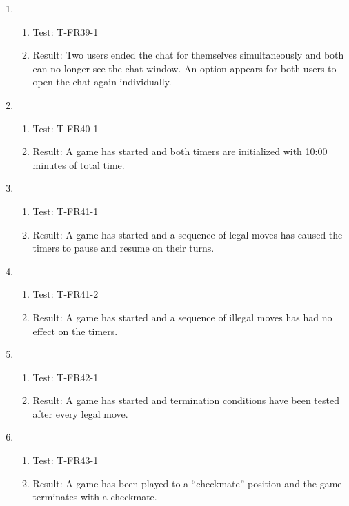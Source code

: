 \documentclass[12pt, titlepage]{article}
\begin{document}
\begin{enumerate}[\indent {}]
        \item 
            \begin{enumerate}[ ]
                \item Test: T-FR39-1
                \item Result: Two users ended the chat for themselves simultaneously and both can no longer see the chat window. An option appears for both users to open the chat again individually.
            \end{enumerate}
            
        \item 
            \begin{enumerate}[ ]
                \item Test: T-FR40-1
                \item Result: A game has started and both timers are initialized with 10:00 minutes of total time.
            \end{enumerate}
            
        \item 
            \begin{enumerate}[ ]
                \item Test: T-FR41-1
                \item Result: A game has started and a sequence of legal moves has caused the timers to pause and resume on their turns.
            \end{enumerate}
            
        \item 
            \begin{enumerate}[ ]
                \item Test: T-FR41-2
                \item Result: A game has started and a sequence of illegal moves has had no effect on the timers.
            \end{enumerate}
            
        \item 
            \begin{enumerate}[ ]
                \item Test: T-FR42-1
                \item Result: A game has started and termination conditions have been tested after every legal move.
            \end{enumerate}
            
        \item 
            \begin{enumerate}[ ]
                \item Test: T-FR43-1
                \item Result: A game has been played to a ``checkmate'' position and the game terminates with a checkmate.
            \end{enumerate}
            

\end{enumerate}
\end{document}
